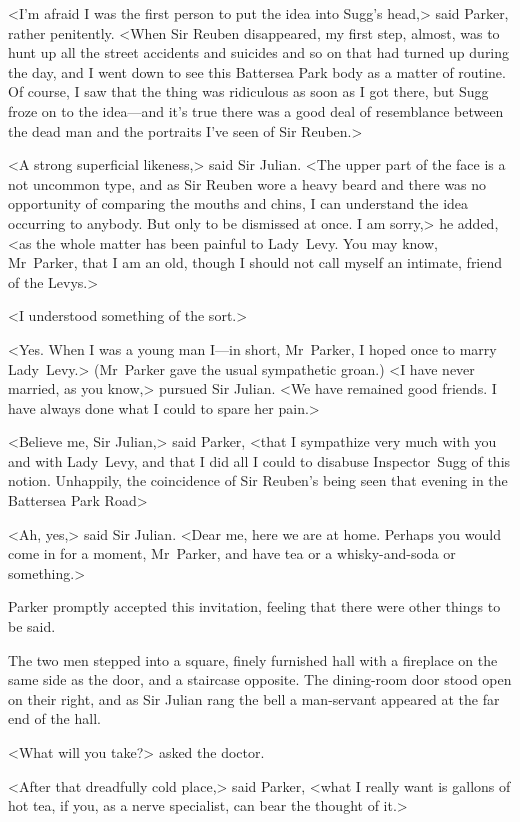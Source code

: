 <I'm afraid I was the first person to put the idea into Sugg's head,> said Parker, rather penitently. <When Sir Reuben disappeared, my first step, almost, was to hunt up all the street accidents and suicides and so on that had turned up during the day, and I went down to see this Battersea Park body as a matter of routine. Of course, I saw that the thing was ridiculous as soon as I got there, but Sugg froze on to the idea—and it's true there was a good deal of resemblance between the dead man and the portraits I've seen of Sir Reuben.>

<A strong superficial likeness,> said Sir Julian. <The upper part of the face is a not uncommon type, and as Sir Reuben wore a heavy beard and there was no opportunity of comparing the mouths and chins, I can understand the idea occurring to anybody. But only to be dismissed at once. I am sorry,> he added, <as the whole matter has been painful to Lady~Levy. You may know, Mr~Parker, that I am an old, though I should not call myself an intimate, friend of the Levys.>

<I understood something of the sort.>

<Yes. When I was a young man I—in short, Mr~Parker, I hoped once to marry Lady~Levy.> (Mr~Parker gave the usual sympathetic groan.) <I have never married, as you know,> pursued Sir Julian. <We have remained good friends. I have always done what I could to spare her pain.>

<Believe me, Sir Julian,> said Parker, <that I sympathize very much with you and with Lady~Levy, and that I did all I could to disabuse Inspector~Sugg of this notion. Unhappily, the coincidence of Sir Reuben's being seen that evening in the Battersea Park Road\longdash>

<Ah, yes,> said Sir Julian. <Dear me, here we are at home. Perhaps you would come in for a moment, Mr~Parker, and have tea or a whisky-and-soda or something.>

Parker promptly accepted this invitation, feeling that there were other things to be said.

The two men stepped into a square, finely furnished hall with a fireplace on the same side as the door, and a staircase opposite. The dining-room door stood open on their right, and as Sir Julian rang the bell a man-servant appeared at the far end of the hall.

<What will you take?> asked the doctor.

<After that dreadfully cold place,> said Parker, <what I really want is gallons of hot tea, if you, as a nerve specialist, can bear the thought of it.>

